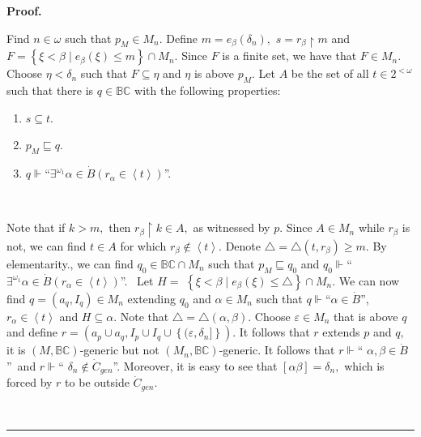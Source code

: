 \documentclass{article}
\newenvironment{proof}[1][Proof]{\noindent\textbf{#1.} }{\ \rule{0.5em}{0.5em}}
\begin{document}
\begin{proof}
\qquad\qquad\qquad\qquad

Find $n\in\omega$ such that $p_{M}\in M_{n}$. Define $m=e_{\beta}\left(
\delta_{n}\right)  ,$ $s=r_{\beta}\upharpoonright m$ and $F=\left\{  \xi
<\beta\mid e_{\beta}\left(  \xi\right)  \leq m\right\}  \cap M_{n}.$ Since $F$
is a finite set, we have that $F\in M_{n}.$ Choose $\eta<\delta_{n}$ such that
$F\subseteq\eta$ and $\eta$ is above $p_{M}.$ Let $A$ be the set of all
$t\in2^{<\omega}$ such that there is $q\in\mathbb{BC}$ with the following properties:

\begin{enumerate}
\item $s\subseteq t.$

\item $p_{M}\sqsubseteq q.$

\item $q\Vdash$\textquotedblleft$\exists^{\omega_{1}}\alpha\in\dot{B}\left(
r_{\alpha}\in\left\langle t\right\rangle \right)  $\textquotedblright.
\end{enumerate}

\qquad\ \ 

Note that if $k>m,$ then $r_{\beta}\upharpoonright k\in A,$ as witnessed by
$p.$ Since $A\in M_{n}$ while $r_{\beta}$ is not, we can find $t\in A$ for
which $r_{\beta}\notin\left\langle t\right\rangle .$ Denote $\triangle
=\triangle\left(  t,r_{\beta}\right)  \geq m.$ By elementarity., we can find
$q_{0}\in\mathbb{BC}\cap M_{n}$ such that $p_{M}\sqsubseteq q_{0}$ and
$q_{0}\Vdash$\textquotedblleft$\exists^{\omega_{1}}\alpha\in\dot{B}\left(
r_{\alpha}\in\left\langle t\right\rangle \right)  $\textquotedblright. \ Let
$H=$ $\left\{  \xi<\beta\mid e_{\beta}\left(  \xi\right)  \leq\triangle
\right\}  \cap M_{n}.$ We can now find $q=\left(  a_{q},I_{q}\right)  \in
M_{n}$ extending $q_{0}$ and $\alpha\in M_{n}$ such that $q\Vdash
$\textquotedblleft$\alpha\in\dot{B}$\textquotedblright, $r_{\alpha}%
\in\left\langle t\right\rangle $ and $H\subseteq\alpha.$ Note that
$\triangle=\triangle\left(  \alpha,\beta\right)  .$ Choose $\varepsilon\in
M_{n}$ that is above $q$ and define $r=\left(  a_{p}\cup a_{q},I_{p}\cup
I_{q}\cup\left\{  (\varepsilon,\delta_{n}]\right\}  \right)  .$ It follows
that $r$ extends $p$ and $q,$ it is $(M,\mathbb{BC})$-generic but not
$(M_{n},\mathbb{BC})$-generic. It follows that $r\Vdash$\textquotedblleft%
$\alpha,\beta\in\dot{B}$\textquotedblright\ and $r\Vdash$\textquotedblleft%
$\delta_{n}\notin\dot{C}_{gen}$\textquotedblright. Moreover, it is easy to see
that $\left[  \alpha\beta\right]  =\delta_{n},$ which is forced by $r$ to be
outside $\dot{C}_{gen}.$


\end{proof}
\end{document}
